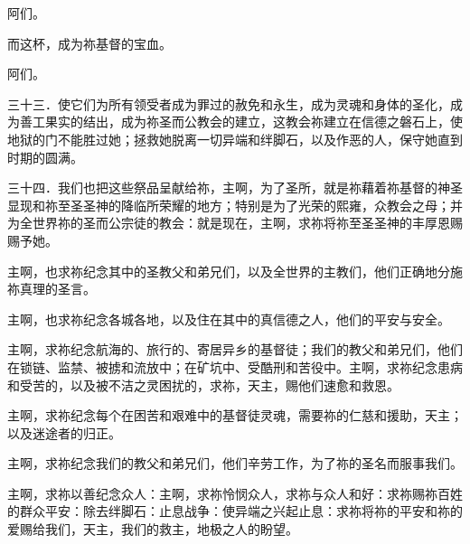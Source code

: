 \par

阿们。\par

\par

而这杯，成为祢基督的宝血。\par

\par

阿们。\par

\par

三十三．使它们为所有领受者成为罪过的赦免和永生，成为灵魂和身体的圣化，成为善工果实的结出，成为祢圣而公教会的建立，这教会祢建立在信德之磐石上，使地狱的门不能胜过她；拯救她脱离一切异端和绊脚石，以及作恶的人，保守她直到时期的圆满。\par

\par

三十四．我们也把这些祭品呈献给祢，主啊，为了圣所，就是祢藉着祢基督的神圣显现和祢至圣圣神的降临所荣耀的地方；特别是为了光荣的熙雍，众教会之母；并为全世界祢的圣而公宗徒的教会：就是现在，主啊，求祢将祢至圣圣神的丰厚恩赐赐予她。\par

主啊，也求祢纪念其中的圣教父和弟兄们，以及全世界的主教们，他们正确地分施祢真理的圣言。\par

主啊，也求祢纪念各城各地，以及住在其中的真信德之人，他们的平安与安全。\par

主啊，求祢纪念航海的、旅行的、寄居异乡的基督徒；我们的教父和弟兄们，他们在锁链、监禁、被掳和流放中；在矿坑中、受酷刑和苦役中。主啊，求祢纪念患病和受苦的，以及被不洁之灵困扰的，求祢，天主，赐他们速愈和救恩。\par

主啊，求祢纪念每个在困苦和艰难中的基督徒灵魂，需要祢的仁慈和援助，天主；以及迷途者的归正。\par

主啊，求祢纪念我们的教父和弟兄们，他们辛劳工作，为了祢的圣名而服事我们。\par

主啊，求祢以善纪念众人：主啊，求祢怜悯众人，求祢与众人和好：求祢赐祢百姓的群众平安：除去绊脚石：止息战争：使异端之兴起止息：求祢将祢的平安和祢的爱赐给我们，天主，我们的救主，地极之人的盼望。\par

